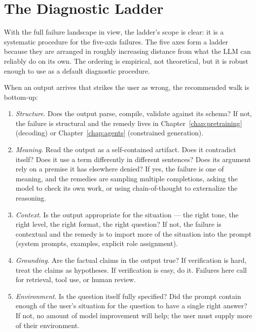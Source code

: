 \section{The Diagnostic Ladder}

With the full failure landscape in view, the ladder's scope is
clear: it is a systematic procedure for the five-axis failures.
The five axes form a ladder because they are arranged in roughly
increasing distance from what the LLM can reliably do on its own.
The ordering is empirical, not theoretical, but it is robust enough
to use as a default diagnostic procedure.

When an output arrives that strikes the user as wrong, the
recommended walk is bottom-up:
\begin{enumerate}
  \item \emph{Structure}. Does the output parse, compile, validate
        against its schema? If not, the failure is structural and
        the remedy lives in Chapter~\ref{chap:pretraining} (decoding) or Chapter~\ref{chap:agents}
        (constrained generation).
  \item \emph{Meaning}. Read the output as a self-contained
        artifact. Does it contradict itself? Does it use a term
        differently in different sentences? Does its argument rely
        on a premise it has elsewhere denied? If yes, the failure
        is one of meaning, and the remedies are sampling multiple
        completions, asking the model to check its own work, or
        using chain-of-thought to externalize the reasoning.
  \item \emph{Context}. Is the output appropriate for the
        situation --- the right tone, the right level, the right
        format, the right question? If not, the failure is
        contextual and the remedy is to import more of the
        situation into the prompt (system prompts, examples,
        explicit role assignment).
  \item \emph{Grounding}. Are the factual claims in the output
        true? If verification is hard, treat the claims as
        hypotheses. If verification is easy, do it. Failures here
        call for retrieval, tool use, or human review.
  \item \emph{Environment}. Is the question itself fully specified?
        Did the prompt contain enough of the user's situation for
        the question to have a single right answer? If not, no
        amount of model improvement will help; the user must
        supply more of their environment.
\end{enumerate}

